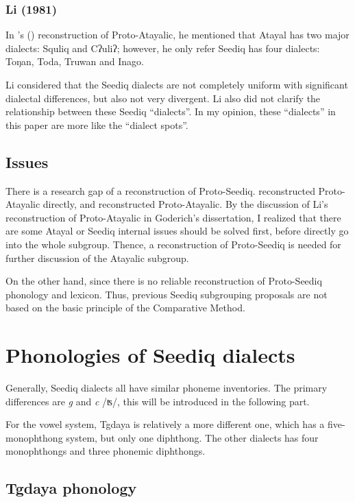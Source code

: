 \documentclass[12pt]{article}
\newcommand{\psedf}{Proto-Seediq\xspace}
\newcommand{\stgf}{Tgdaya\xspace}
\begin{document}
\subsubsection{Li (1981)}

In \citeauthor{li1981paic}'s (\citeyear{li1981paic}) reconstruction of Proto-Atayalic, he mentioned that Atayal has two major dialects: Squliq and Cʔuliʔ; however, he only refer Seediq has four dialects: Toŋan, Toda, Truwan and Inago. 

Li considered that the Seediq dialects are not completely uniform with significant dialectal differences, but also not very divergent. Li also did not clarify the relationship between these Seediq ``dialects''. In my opinion, these ``dialects'' in this paper are more like the ``dialect spots''.

\subsection{Issues}

There is a research gap of a reconstruction of \psedf. \textcite{li1981paic} reconstructed Proto-Atayalic directly, and \textcite{goderich2020phd} reconstructed Proto-Atayalic. By the discussion of Li's reconstruction of Proto-Atayalic in Goderich's dissertation, I realized that there are some Atayal or Seediq internal issues should be solved first, before directly go into the whole subgroup. Thence, a reconstruction of \psedf is needed for further discussion of the Atayalic subgroup. 

On the other hand, since there is no reliable reconstruction of \psedf phonology and lexicon. Thus, previous 
Seediq subgrouping proposals are not based on the basic principle of the Comparative Method.  

\section{Phonologies of Seediq dialects}

Generally, Seediq dialects all have similar phoneme inventories. The primary differences are \textit{g} and \textit{c} /ʦ/, this will be introduced in the following part. 

For the vowel system, \stgf is relatively a more different one, which has a five-monophthong system, but only one diphthong. The other dialects has four monophthongs and three phonemic diphthongs. 

\subsection{Tgdaya phonology}
\end{document}
